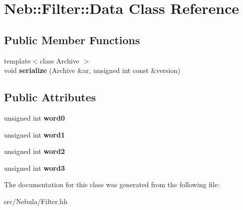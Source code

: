 \hypertarget{classNeb_1_1Filter_1_1Data}{\section{\-Neb\-:\-:\-Filter\-:\-:\-Data \-Class \-Reference}
\label{classNeb_1_1Filter_1_1Data}
}
\subsection*{\-Public \-Member \-Functions}
\begin{DoxyCompactItemize}
\item 
\hypertarget{classNeb_1_1Filter_1_1Data_a727a2c1fa8011f050ada6e871230b585}{{\footnotesize template$<$class Archive $>$ }\\void {\bfseries serialize} (\-Archive \&ar, unsigned int const \&version)}\label{classNeb_1_1Filter_1_1Data_a727a2c1fa8011f050ada6e871230b585}

\end{DoxyCompactItemize}
\subsection*{\-Public \-Attributes}
\begin{DoxyCompactItemize}
\item 
\hypertarget{classNeb_1_1Filter_1_1Data_a4c58a7b73274baec2618f3aaa658737e}{unsigned int {\bfseries word0}}\label{classNeb_1_1Filter_1_1Data_a4c58a7b73274baec2618f3aaa658737e}

\item 
\hypertarget{classNeb_1_1Filter_1_1Data_a53392967cf835071bf2bb34fa96dcf1c}{unsigned int {\bfseries word1}}\label{classNeb_1_1Filter_1_1Data_a53392967cf835071bf2bb34fa96dcf1c}

\item 
\hypertarget{classNeb_1_1Filter_1_1Data_a32ac663d2a72a3c1f3e97dd329c0db5c}{unsigned int {\bfseries word2}}\label{classNeb_1_1Filter_1_1Data_a32ac663d2a72a3c1f3e97dd329c0db5c}

\item 
\hypertarget{classNeb_1_1Filter_1_1Data_a5e0caefa84858430a4456fcd381cb537}{unsigned int {\bfseries word3}}\label{classNeb_1_1Filter_1_1Data_a5e0caefa84858430a4456fcd381cb537}

\end{DoxyCompactItemize}


\-The documentation for this class was generated from the following file\-:\begin{DoxyCompactItemize}
\item 
src/\-Nebula/\-Filter.\-hh\end{DoxyCompactItemize}

